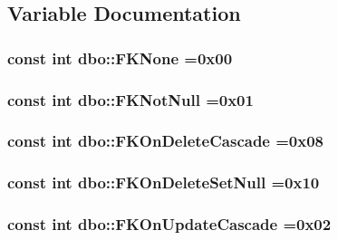 \subsection{Variable Documentation}
\hypertarget{namespacedbo_a852726cb6e354fe0b7427952d7ee9bbd}{
\subsubsection[{F\+K\+None}]{\setlength{\rightskip}{0pt plus 5cm}const int dbo\+::\+F\+K\+None =0x00}}\label{namespacedbo_a852726cb6e354fe0b7427952d7ee9bbd}
\hypertarget{namespacedbo_aaee974161f0dade23c6dbd3aa44a145b}{
\subsubsection[{F\+K\+Not\+Null}]{\setlength{\rightskip}{0pt plus 5cm}const int dbo\+::\+F\+K\+Not\+Null =0x01}}\label{namespacedbo_aaee974161f0dade23c6dbd3aa44a145b}
\hypertarget{namespacedbo_a58edf54e3f9cb2c68130845cb2cff826}{
\subsubsection[{F\+K\+On\+Delete\+Cascade}]{\setlength{\rightskip}{0pt plus 5cm}const int dbo\+::\+F\+K\+On\+Delete\+Cascade =0x08}}\label{namespacedbo_a58edf54e3f9cb2c68130845cb2cff826}
\hypertarget{namespacedbo_ad8a98b325ad0becbd7231e924c6dbe26}{
\subsubsection[{F\+K\+On\+Delete\+Set\+Null}]{\setlength{\rightskip}{0pt plus 5cm}const int dbo\+::\+F\+K\+On\+Delete\+Set\+Null =0x10}}\label{namespacedbo_ad8a98b325ad0becbd7231e924c6dbe26}
\hypertarget{namespacedbo_ad015d5bfa1c6cfd1efbb7b6e97eb22ae}{
\subsubsection[{F\+K\+On\+Update\+Cascade}]{\setlength{\rightskip}{0pt plus 5cm}const int dbo\+::\+F\+K\+On\+Update\+Cascade =0x02}}\label{namespacedbo_ad015d5bfa1c6cfd1efbb7b6e97eb22ae}
